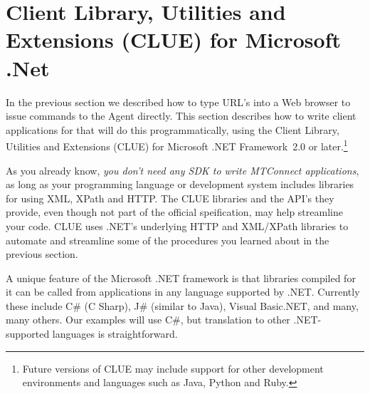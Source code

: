 \section{Client Library, Utilities and Extensions (CLUE) for Microsoft .Net}
\label{sec:app}

In the previous section we described how to type URL's into a Web
browser to issue commands to the Agent directly.  This section describes
how to write client applications for \mtc{} that will do this
programmatically, using the \mtc{} Client Library, Utilities and
Extensions (CLUE) for Microsoft .NET Framework~2.0 or
later.\footnote{Future versions of CLUE may include support for other
  development environments and languages such as Java, Python and Ruby.}

As you already know, \emph{you don't need any SDK to write MTConnect
  applications}, as long as your programming language or development
system includes libraries for using XML, XPath and HTTP.  The CLUE
libraries and the API's they provide, even though not part of the
official \mtc{} speification, may help streamline your code.  CLUE uses
.NET's underlying HTTP and XML/XPath libraries to automate and
streamline some of the procedures you learned about in the previous
section.


A unique feature of the Microsoft .NET framework is that libraries
compiled for it can be called from applications in any language
supported by .NET.  Currently these include C\# (C Sharp), J\# (similar
to Java), Visual Basic.NET, and many, many others.  Our examples will
use C\#, but translation to other .NET-supported languages is
straightforward.


